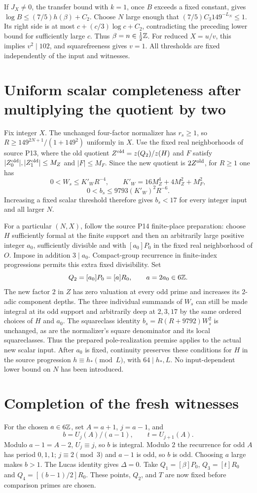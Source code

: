 \documentclass[11pt]{article}
\begin{document}
If $J_X\ne0$, the transfer bound with $k=1$, once $B$ exceeds a fixed
constant, gives $\log B\le(7/5)h(\beta)+C_2$.
Choose $N$ large enough that $(7/5)C_3 149^{-L_N}\le1$.
Its right side is at most $c+(c/3)\log c+C_2$, contradicting the
preceding lower bound for sufficiently large $c$. Thus
$\beta=n\in\tfrac12\mathbb Z$. For reduced $X=u/v$, this implies
$v^2\mid102$, and squarefreeness gives $v=1$. All thresholds are
fixed independently of the input and witnesses.

\section*{Uniform scalar completeness after multiplying the quotient by two}
Fix integer $X$. The unchanged four-factor normalizer has $r_s\ge1$,
so $R\ge149^{2N+1}/(1+149^2)$ uniformly in $X$.
Use the fixed real neighborhoods of source P13, where the old quotient
$Z^{\rm old}=z(Q_2)/z(H)$ and $F$ satisfy
$|Z^{\rm old}_0|,|Z^{\rm old}_1|\le M_Z$ and $|F|\le M_F$.
Since the new quotient is $2Z^{\rm old}$, for $R\ge1$ one has
\[
 0<W_s\le K'_W R^{-4},\qquad
 K'_W=16M_Z^4+4M_Z^2+M_F^2,
\]
\[
                   0<b_s\le9793(K'_W)^2 R^{-6}.
\]
Increasing a fixed scalar threshold therefore gives $b_s<17$ for every
integer input and all larger $N$.

For a particular $(N,X)$, follow the source P14 finite-place preparation:
choose $H$ sufficiently formal at the finite support and then an
arbitrarily large positive integer $a_0$, sufficiently divisible and
with $[a_0]P_0$ in the fixed real neighborhood of $O$. Impose in addition
$3\mid a_0$. Compact-group recurrence in finite-index progressions
permits this extra fixed divisibility. Set
\[
                     Q_2=[a_0]P_0=[a]R_0,\qquad a=2a_0\in6\mathbb Z.
\]
The new factor $2$ in $Z$ has zero valuation at every odd prime and
increases its $2$-adic component depths. The three individual summands
of $W_s$ can still be made integral at its odd support and arbitrarily
deep at $2,3,17$ by the same ordered choices of $H$ and $a_0$.
The squareclass identity $b_s=R(R+9792)W_s^2$ is unchanged, as are the
normalizer's square denominator and its local squareclasses. Thus the
prepared pole-realization premise applies to the actual new scalar input.
After $a_0$ is fixed, continuity preserves these conditions for $H$ in
the source progression $h\equiv h_*\pmod L$, with $64\mid h_*,L$.
No input-dependent lower bound on $N$ has been introduced.

\section*{Completion of the fresh witnesses}
For the chosen $a\in6\mathbb Z$, set $A=a+1$, $j=a-1$, and
\[
                   b=U_j(A)/(a-1),\qquad t=U_{j+1}(A).
\]
Modulo $a-1=A-2$, $U_j\equiv j$, so $b$ is integral.
Modulo $2$ the recurrence for odd $A$ has period $0,1,1$;
$j\equiv2\pmod3$ and $a-1$ is odd, so $b$ is odd. Choosing $a$
large makes $b>1$. The Lucas identity gives $\Delta=0$.
Take $Q_1=[\beta]P_0$, $Q_3=[t]R_0$ and
$Q_4=[(b-1)/2]R_0$. These points, $Q_2$, and $T$ are now fixed
before comparison primes are chosen.
\end{document}
